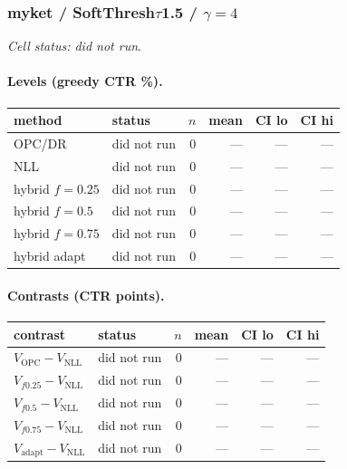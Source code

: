 \documentclass[10pt,a4paper]{article}
\begin{document}
\subsubsection{myket / SoftThresh$\tau$1.5 / $\gamma=4$}
\emph{Cell status: did not run}.
\paragraph{Levels (greedy CTR \%).}
{\centering\small\begin{tabular}{llrrrr}
\toprule method & status & $n$ & mean & CI lo & CI hi \\
\midrule
OPC/DR & did not run & 0 & --- & --- & --- \\
NLL & did not run & 0 & --- & --- & --- \\
hybrid $f{=}0.25$ & did not run & 0 & --- & --- & --- \\
hybrid $f{=}0.5$ & did not run & 0 & --- & --- & --- \\
hybrid $f{=}0.75$ & did not run & 0 & --- & --- & --- \\
hybrid adapt & did not run & 0 & --- & --- & --- \\
\bottomrule\end{tabular}\par}
\paragraph{Contrasts (CTR points).}
{\centering\small\begin{tabular}{llrrrr}
\toprule contrast & status & $n$ & mean & CI lo & CI hi \\
\midrule
$V_{\mathrm{OPC}}-V_{\mathrm{NLL}}$ & did not run & 0 & --- & --- & --- \\
$V_{f0.25}-V_{\mathrm{NLL}}$ & did not run & 0 & --- & --- & --- \\
$V_{f0.5}-V_{\mathrm{NLL}}$ & did not run & 0 & --- & --- & --- \\
$V_{f0.75}-V_{\mathrm{NLL}}$ & did not run & 0 & --- & --- & --- \\
$V_{\mathrm{adapt}}-V_{\mathrm{NLL}}$ & did not run & 0 & --- & --- & --- \\
\bottomrule\end{tabular}\par}
\end{document}

